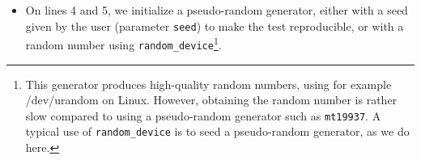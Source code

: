 \documentclass[12pt,a4paper,twoside,openright]{book}
\begin{document}
\begin{itemize}


\item On lines 4 and 5, we initialize a pseudo-random generator, either with a seed given by the user (parameter \texttt{seed}) to make the test reproducible, or with a random number using \texttt{random_device}\footnote{This generator produces high-quality random numbers, using for example {\ttfamily /dev/urandom} on Linux. However, obtaining the random number is rather slow compared to using a pseudo-random generator such as \texttt{mt19937}. A typical use of \texttt{random_device} is to seed a pseudo-random generator, as we do here.}.


\end{itemize}
\end{document}
